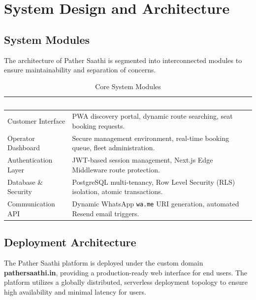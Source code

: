 \documentclass[12pt, a4paper, oneside]{report}
\begin{document}
\chapter{System Design and Architecture}

\section{System Modules}
The architecture of Pather Saathi is segmented into interconnected modules to ensure maintainability and separation of concerns.

\begin{table}[htbp]
    \centering
    \caption{Core System Modules}
    \renewcommand{\arraystretch}{1.5}
    \begin{tabularx}{\textwidth}{l X}
    \toprule
    \rowcolor{brandteal}
    \multicolumn{1}{c}{\textcolor{white}{\textbf{Module}}} & \multicolumn{1}{c}{\textcolor{white}{\textbf{Functionality}}} \\
    \midrule
    \rowcolor{lightgray!30}
    Customer Interface & PWA discovery portal, dynamic route searching, seat booking requests. \\
    Operator Dashboard & Secure management environment, real-time booking queue, fleet administration. \\
    \rowcolor{lightgray!30}
    Authentication Layer & JWT-based session management, Next.js Edge Middleware route protection. \\
    Database \& Security & PostgreSQL multi-tenancy, Row Level Security (RLS) isolation, atomic transactions. \\
    \rowcolor{lightgray!30}
    Communication API & Dynamic WhatsApp \texttt{wa.me} URI generation, automated Resend email triggers. \\
    \bottomrule
    \end{tabularx}
\end{table}

\section{Deployment Architecture}
The Pather Saathi platform is deployed under the custom domain \textbf{pathersaathi.in}, providing a production-ready web interface for end users. The platform utilizes a globally distributed, serverless deployment topology to ensure high availability and minimal latency for users.
\end{document}
